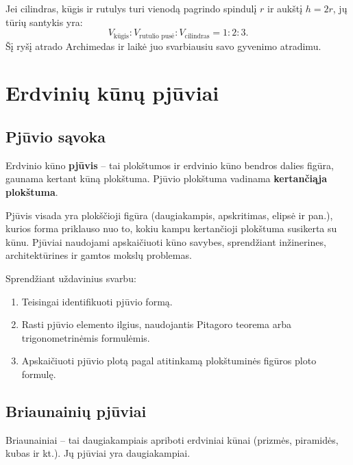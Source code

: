 \begin{remark}
Jei cilindras, kūgis ir rutulys turi vienodą pagrindo spindulį $r$ ir aukštį $h = 2r$, jų tūrių santykis yra:
\[
    V_{\text{kūgis}} : V_{\text{rutulio pusė}} : V_{\text{cilindras}} = 1 : 2 : 3.
\]
Šį ryšį atrado Archimedas ir laikė juo svarbiausiu savo gyvenimo atradimu.
\end{remark}


\section{Erdvinių kūnų pjūviai}

\subsection{Pjūvio sąvoka}

\begin{definition}
Erdvinio kūno \textbf{pjūvis} – tai plokštumos ir erdvinio kūno bendros dalies figūra, gaunama kertant kūną plokštuma. Pjūvio plokštuma vadinama \textbf{kertančiąja plokštuma}.
\end{definition}

Pjūvis visada yra plokščioji figūra (daugiakampis, apskritimas, elipsė ir pan.), kurios forma priklauso nuo to, kokiu kampu kertančioji plokštuma susikerta su kūnu. Pjūviai naudojami apskaičiuoti kūno savybes, sprendžiant inžinerines, architektūrines ir gamtos mokslų problemas.

\begin{remark}
Sprendžiant uždavinius svarbu:
\begin{enumerate}
    \item Teisingai identifikuoti pjūvio formą.
    \item Rasti pjūvio elemento ilgius, naudojantis Pitagoro teorema arba trigonometrinėmis formulėmis.
    \item Apskaičiuoti pjūvio plotą pagal atitinkamą plokštuminės figūros ploto formulę.
\end{enumerate}
\end{remark}

\subsection{Briaunainių pjūviai}

Briaunainiai – tai daugiakampiais apriboti erdviniai kūnai (prizmės, piramidės, kubas ir kt.). Jų pjūviai yra daugiakampiai.

